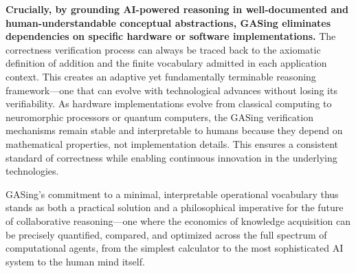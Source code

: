 \textbf{Crucially, by grounding AI-powered reasoning in well-documented and human-understandable conceptual abstractions, GASing eliminates dependencies on specific hardware or software implementations.} The correctness verification process can always be traced back to the axiomatic definition of addition and the finite vocabulary admitted in each application context. This creates an adaptive yet fundamentally terminable reasoning framework—one that can evolve with technological advances without losing its verifiability. As hardware implementations evolve from classical computing to neuromorphic processors or quantum computers, the GASing verification mechanisms remain stable and interpretable to humans because they depend on mathematical properties, not implementation details. This ensures a consistent standard of correctness while enabling continuous innovation in the underlying technologies.

GASing's commitment to a minimal, interpretable operational vocabulary thus stands as both a practical solution and a philosophical imperative for the future of collaborative reasoning—one where the economics of knowledge acquisition can be precisely quantified, compared, and optimized across the full spectrum of computational agents, from the simplest calculator to the most sophisticated AI system to the human mind itself.